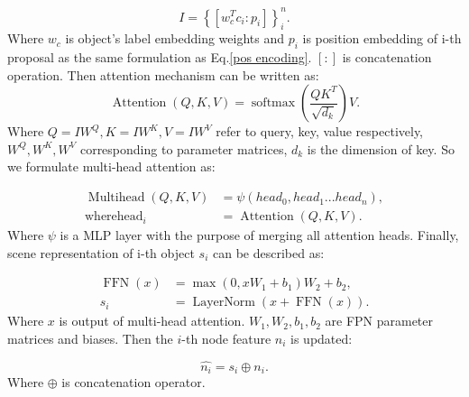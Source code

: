 \documentclass[runningheads]{llncs}
\begin{document}
\begin{equation}
  {I}=\left\{ \left[ {w}^{T}_{c}c_{i}:p_{i}\right] \right\}_{i}^{n}.
  \label{att_input}
\end{equation}
Where $w_{c}$ is object's label embedding weights  and $p_{i}$ is position
embedding of i-th proposal as the same formulation as Eq.\ref{pos encoding}. $
  \left[ : \right]$ is concatenation operation. Then attention mechanism can be
written as:
\begin{equation}
  \operatorname{Attention}\left(Q,K,V\right)=\operatorname{softmax}\left(\frac{Q
    K^{T}}{\sqrt{d_{k}}}\right) V.
  \label{attention}
\end{equation}
Where $Q=I W^{Q}, K=I W^{K}, V=I W^{V}$ refer to query, key, value
respectively, $W^{Q}, W^{K},W^{V}$ corresponding to parameter matrices, $d_{k}$
is the dimension of key. So we formulate multi-head attention as:

\begin{align}
  \operatorname{Multihead}\left(Q,K,V\right) & =\psi\left(
  head_{0},head_{1}...head_{n} \right),                                                     \\
  \text{where}
  \operatorname{head}_{i}                    & =\operatorname{Attention}\left(Q,K,V\right).
  \label{SCENE}
\end{align}
Where $\psi$ is a MLP layer with the purpose of merging all attention heads.
Finally, scene representation of i-th object $s_{i}$  can be described as:

\begin{align}
  \operatorname{FFN}(x) & =\max \left(0, x W_{1}+b_{1}\right) W_{2}+b_{2},    \\
  s_{i}                 & =\operatorname{LayerNorm}(x+\operatorname{FFN}(x)).
  \label{fpn}
\end{align}
Where $x$ is output of multi-head attention. $W_{1},W_{2},b_{1},b_{2}$ are FPN
parameter matrices and biases.
Then the $i$-th node feature ${n_{i}}$ is updated:

\begin{equation}
  \hat{n_{i}}=s_{i}\oplus n_{i}.
  \label{multi-head}
\end{equation}
Where $\oplus$ is concatenation operator.
\end{document}
